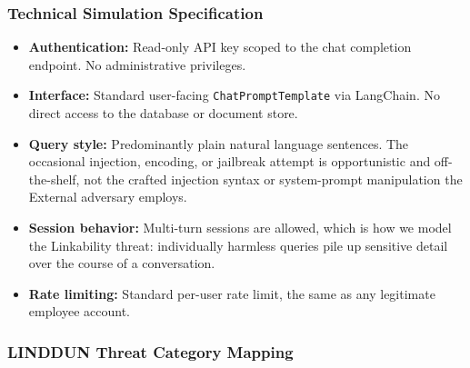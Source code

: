 \documentclass[12pt,a4paper]{report}
\begin{document}
\subsubsection{Technical Simulation Specification}

\begin{prosebox}
\begin{itemize}[leftmargin=1.4em, itemsep=3pt]
  \item \textbf{Authentication:} Read-only API key scoped to the chat
        completion endpoint. No administrative privileges.
  \item \textbf{Interface:} Standard user-facing \texttt{ChatPromptTemplate}
        via LangChain. No direct access to the database or document store.
  \item \textbf{Query style:} Predominantly plain natural language sentences.
        The occasional injection, encoding, or jailbreak attempt is opportunistic
        and off-the-shelf, not the crafted injection syntax or system-prompt
        manipulation the External adversary employs.
  \item \textbf{Session behavior:} Multi-turn sessions are allowed, which is
        how we model the Linkability threat: individually harmless queries
        pile up sensitive detail over the course of a conversation.
  \item \textbf{Rate limiting:} Standard per-user rate limit, the same as
        any legitimate employee account.
\end{itemize}
\end{prosebox}

\subsubsection{LINDDUN Threat Category Mapping}
\end{document}
